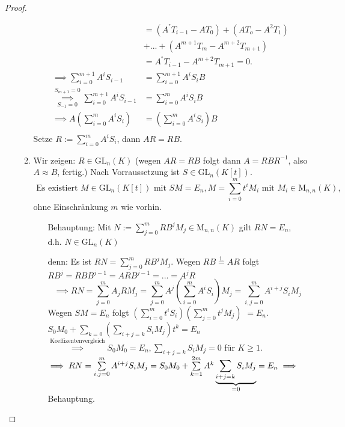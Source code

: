 \documentclass[a4paper, titlepage]{article}
\theoremstyle{definition}
\newcommand{\GL}{\mathrm{GL}}
\newcommand{\M}{\mathrm{M}}
\begin{document}
\begin{proof}
\begin{enumerate}[(i) $\implies$ (ii):]
\begin{enumerate}
\begin{align*}
                &= (A^{°}T_{i-1}-AT_0)+(AT_o-A^2T_1)\\
                &+...+ (A^{m+1}T_m-A^{m+2}T_{m+1})\\
                &= A^{°}T_{i-1}-A^{m+2}T_{m+1}=0.\\
                \implies \sum\limits_{i=0}^{m+1}A^{i}S_{i-1}&= \sum\limits_{i=0}^{m+1}A^{i}S_{i}B\\
                \overset{S_{m+1}=0}{\underset{S_{-1}=0}{\implies}} \sum\limits_{i=0}^{m+1}A^{i}S_{i-1} &=\sum\limits_{i=0}^{m}A^{i}S_{i}B\\
                \implies A\left(\sum\limits_{i=0}^{m}A^{i}S_i\right)&=\left(\sum_{i=0}^{m}A^{i}S_i\right)B\\
            \end{align*}
            Setze $R:=\sum\limits_{i=0}^{m}A^{i}S_i$, dann $AR=RB.$
            \item Wir zeigen: $R\in\GL_n(K)$ (wegen $AR=RB$ folgt dann $A=RBR^{-1}$, also $A\approx B$, fertig.)
                Nach Vorraussetzung ist $S\in\GL_{n}(K[t])$. 
                $$\text{ Es existiert } M\in\GL_{n}(K[t]) \text{ mit } SM=E_n, M=\sum\limits_{i=0}^{m}t^{i}M_i \text{ mit } M_i\in\M_{n,n}(K),$$
                ohne Einschränkung $m$ wie vorhin.
                \begin{enumerate}
                    \item [Behauptung:] Mit $N:=\sum\limits_{j=0}^{m}RB^{j}M_j\in\M_{n,n}(K)$ gilt $RN=E_n$, d.h. $N\in\GL_n(K)$
                    \item [denn:] Es ist $RN=\sum\limits_{j=0}^{m}RB^{j}M_j.$ Wegen $RB\overset{1.}{=}AR$ folgt $RB^{j}=RBB^{j-1}=ARB^{j-1}=...=A^{j}R$
                        $$\implies RN=\sum\limits_{j=0}^{m}A_jRM_j=\sum\limits_{j=0}^{m}A^{j}\left(\sum\limits_{i=0}^{m}A^{i}S_i\right)M_{j}=\sum\limits_{i,j=0}^{m}A^{i+j}S_iM_j$$
                        Wegen $SM=E_n$ folgt $\left(\sum\limits_{i=0}^{m}t^{i}S_i\right)\left(\sum\limits_{j=0}^{m}t^{j}M_j\right)$ $=E_n.$\\
                        $S_0M_0+\sum\limits_{k=0}\left(\sum_{i+j=k}S_iM_j\right)t^{k}=E_n$\\
                        $\overset{\text{Koeffizentenvergleich}}{\implies} S_0M_0=E_n, \sum\limits_{i+j=k}S_iM_j=0$ für $K\geq 1.$\\
                        $\implies RN=\sum\limits_{i,j=0}^{m}A^{i+j}S_iM_j=S_0M_0+\sum\limits_{k=1}^{2m}A^k\underbrace{\sum\limits_{i+j=k}S_iM_j}_{=0}=E_n\\\implies$ Behauptung.
                \end{enumerate}
        \end{enumerate}
    \end{enumerate}
    \end{proof}  
\end{document}
